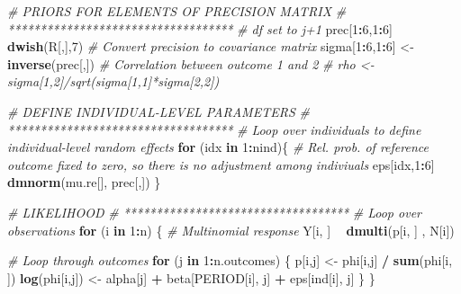 \documentclass[]{article}
\newenvironment{Shaded}{\begin{snugshade}}{\end{snugshade}}
\newcommand{\CommentTok}[1]{\textcolor[rgb]{0.56,0.35,0.01}{\textit{#1}}}
\newcommand{\ControlFlowTok}[1]{\textcolor[rgb]{0.13,0.29,0.53}{\textbf{#1}}}
\newcommand{\DecValTok}[1]{\textcolor[rgb]{0.00,0.00,0.81}{#1}}
\newcommand{\KeywordTok}[1]{\textcolor[rgb]{0.13,0.29,0.53}{\textbf{#1}}}
\newcommand{\NormalTok}[1]{#1}
\newcommand{\OperatorTok}[1]{\textcolor[rgb]{0.81,0.36,0.00}{\textbf{#1}}}
\newcommand{\StringTok}[1]{\textcolor[rgb]{0.31,0.60,0.02}{#1}}
\begin{document}
\begin{Shaded}
\begin{Highlighting}[]
  \CommentTok{# PRIORS FOR ELEMENTS OF PRECISION MATRIX}
  \CommentTok{# ***********************************}
  \CommentTok{# df set to j+1}
\NormalTok{  prec[}\DecValTok{1}\OperatorTok{:}\DecValTok{6}\NormalTok{,}\DecValTok{1}\OperatorTok{:}\DecValTok{6}\NormalTok{] }\OperatorTok{~}\StringTok{ }\KeywordTok{dwish}\NormalTok{(R[,],}\DecValTok{7}\NormalTok{)  }
  \CommentTok{# Convert precision to covariance matrix}
\NormalTok{  sigma[}\DecValTok{1}\OperatorTok{:}\DecValTok{6}\NormalTok{,}\DecValTok{1}\OperatorTok{:}\DecValTok{6}\NormalTok{] <-}\StringTok{ }\KeywordTok{inverse}\NormalTok{(prec[,])   }
  \CommentTok{# Correlation between outcome 1 and 2}
  \CommentTok{# rho <- sigma[1,2]/sqrt(sigma[1,1]*sigma[2,2])  }
  
  \CommentTok{# DEFINE INDIVIDUAL-LEVEL PARAMETERS}
  \CommentTok{# ***********************************}
  \CommentTok{# Loop over individuals to define individual-level random effects}
  \ControlFlowTok{for}\NormalTok{ (idx }\ControlFlowTok{in} \DecValTok{1}\OperatorTok{:}\NormalTok{nind)\{  }
    \CommentTok{# Rel. prob. of reference outcome fixed to zero, so there is no adjustment among indiviuals}
\NormalTok{    eps[idx,}\DecValTok{1}\OperatorTok{:}\DecValTok{6}\NormalTok{] }\OperatorTok{~}\StringTok{ }\KeywordTok{dmnorm}\NormalTok{(mu.re[], prec[,])      }
\NormalTok{  \}}
  
  \CommentTok{# LIKELIHOOD }
  \CommentTok{# ***********************************}
  \CommentTok{# Loop over observations}
  \ControlFlowTok{for}\NormalTok{ (i }\ControlFlowTok{in} \DecValTok{1}\OperatorTok{:}\NormalTok{n) \{     }
    \CommentTok{# Multinomial response}
\NormalTok{    Y[i, ] }\OperatorTok{~}\StringTok{ }\KeywordTok{dmulti}\NormalTok{(p[i, ] , N[i])}

    \CommentTok{# Loop through outcomes}
    \ControlFlowTok{for}\NormalTok{ (j }\ControlFlowTok{in} \DecValTok{1}\OperatorTok{:}\NormalTok{n.outcomes) \{     }
\NormalTok{      p[i,j] <-}\StringTok{ }\NormalTok{phi[i,j] }\OperatorTok{/}\StringTok{ }\KeywordTok{sum}\NormalTok{(phi[i, ])}
      \KeywordTok{log}\NormalTok{(phi[i,j]) <-}\StringTok{ }\NormalTok{alpha[j] }\OperatorTok{+}\StringTok{ }\NormalTok{beta[PERIOD[i], j] }\OperatorTok{+}\StringTok{ }\NormalTok{eps[ind[i], j]}
\NormalTok{    \}}
\NormalTok{  \}}
  

\end{Highlighting}
\end{Shaded}
\end{document}
